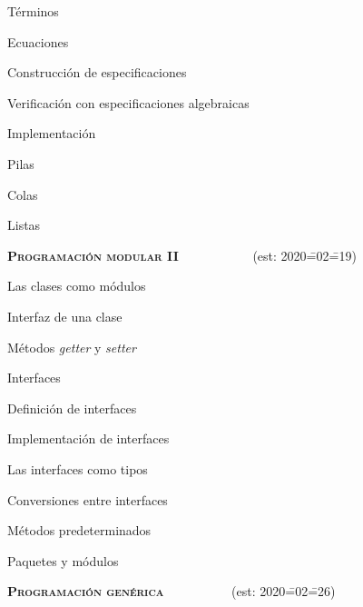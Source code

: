 \begin{longenum}
\begin{longenum}
\begin{longenum}
\begin{longenum}
\begin{longenum}
                \end{longenum}
                \item Términos
                \item Ecuaciones
            \end{longenum}
            \item Construcción de especificaciones
            \item Verificación con especificaciones algebraicas
        \end{longenum}
        \item Implementación
        \begin{longenum}
            \item Pilas
            \item Colas
            \item Listas
        \end{longenum}
    \end{longenum}
    \item \textbf{\textsc{Programación modular II}} \ \ \ \ \ \ \ \ \ \ \ (est: 2020\==02\==19)
    \begin{longenum}
        \item Las clases como módulos
        \begin{longenum}
            \item Interfaz de una clase
            \item Métodos \textit{getter} y \textit{setter}
        \end{longenum}
        \item Interfaces
        \begin{longenum}
            \item Definición de interfaces
            \item Implementación de interfaces
            \item Las interfaces como tipos
            \item Conversiones entre interfaces
            \item Métodos predeterminados
        \end{longenum}
        \item Paquetes y módulos
    \end{longenum}
    \item \textbf{\textsc{Programación genérica}} \ \ \ \ \ \ \ \ \ \ (est: 2020\==02\==26)
    \begin{longenum}

\end{longenum}
\end{longenum}

